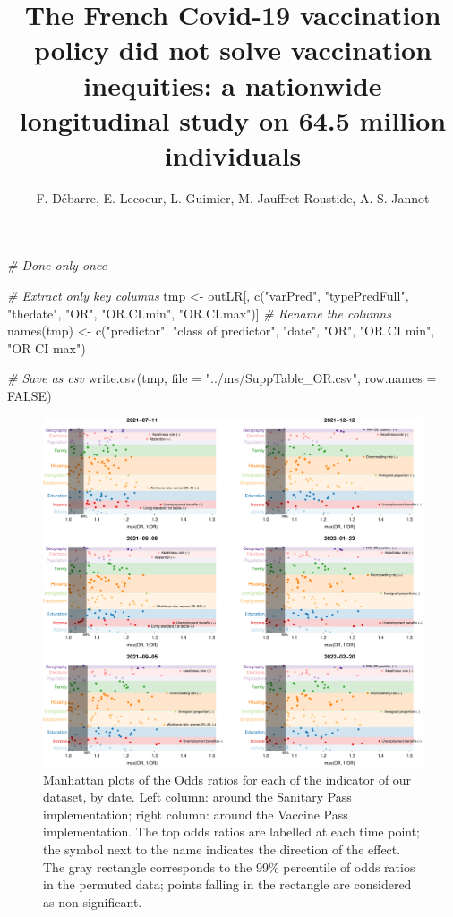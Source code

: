 \documentclass[
]{article}
\title{The French Covid-19 vaccination policy did not solve vaccination inequities: a nationwide longitudinal study on 64.5 million individuals}
\author{F. Débarre, E. Lecoeur, L. Guimier, M. Jauffret-Roustide, A.-S. Jannot}
\date{}
\newenvironment{Shaded}{\begin{snugshade}}{\end{snugshade}}
\newcommand{\AttributeTok}[1]{\textcolor[rgb]{0.77,0.63,0.00}{#1}}
\newcommand{\CommentTok}[1]{\textcolor[rgb]{0.56,0.35,0.01}{\textit{#1}}}
\newcommand{\ConstantTok}[1]{\textcolor[rgb]{0.00,0.00,0.00}{#1}}
\newcommand{\FunctionTok}[1]{\textcolor[rgb]{0.00,0.00,0.00}{#1}}
\newcommand{\NormalTok}[1]{#1}
\newcommand{\OtherTok}[1]{\textcolor[rgb]{0.56,0.35,0.01}{#1}}
\newcommand{\StringTok}[1]{\textcolor[rgb]{0.31,0.60,0.02}{#1}}
\begin{document}
\maketitle

\begin{Shaded}
\begin{Highlighting}[]
\CommentTok{\# Done only once}

\CommentTok{\# Extract only key columns}
\NormalTok{tmp }\OtherTok{\textless{}{-}}\NormalTok{ outLR[, }\FunctionTok{c}\NormalTok{(}\StringTok{"varPred"}\NormalTok{, }\StringTok{"typePredFull"}\NormalTok{, }\StringTok{"thedate"}\NormalTok{, }\StringTok{"OR"}\NormalTok{, }\StringTok{"OR.CI.min"}\NormalTok{, }\StringTok{"OR.CI.max"}\NormalTok{)]}
\CommentTok{\# Rename the columns}
\FunctionTok{names}\NormalTok{(tmp) }\OtherTok{\textless{}{-}} \FunctionTok{c}\NormalTok{(}\StringTok{"predictor"}\NormalTok{, }\StringTok{"class of predictor"}\NormalTok{, }\StringTok{"date"}\NormalTok{, }\StringTok{"OR"}\NormalTok{, }\StringTok{"OR CI min"}\NormalTok{, }\StringTok{"OR CI max"}\NormalTok{)}

\CommentTok{\# Save as csv}
\FunctionTok{write.csv}\NormalTok{(tmp, }\AttributeTok{file =} \StringTok{"../ms/SuppTable\_OR.csv"}\NormalTok{, }\AttributeTok{row.names =} \ConstantTok{FALSE}\NormalTok{)}
\end{Highlighting}
\end{Shaded}

\begin{figure}
\centering
\includegraphics{figs_files/figure-latex/figManhattan-1.pdf}
\caption{\label{fig:figManhattan}Manhattan plots of the Odds ratios for each of the indicator of our dataset, by date. Left column: around the Sanitary Pass implementation; right column: around the Vaccine Pass implementation. The top odds ratios are labelled at each time point; the symbol next to the name indicates the direction of the effect. The gray rectangle corresponds to the 99\% percentile of odds ratios in the permuted data; points falling in the rectangle are considered as non-significant.}
\end{figure}
\end{document}
